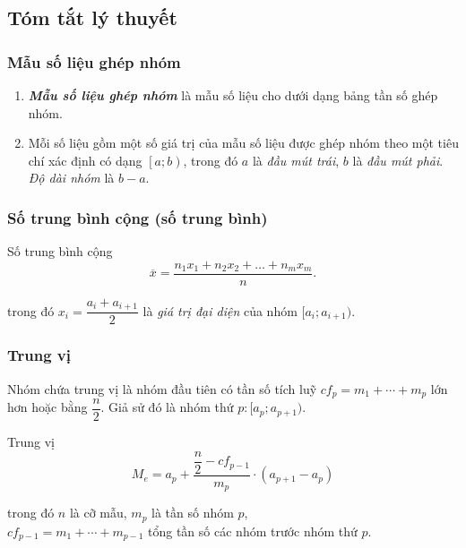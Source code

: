 \setcounter{chapter}{2}
\setcounter{subsubsection}{0}
\setcounter{ex}{0}
\setcounter{bt}{0}
\def\tenchude{Các số đặc trưng đo xu thế trung tâm cho mẫu số liệu ghép nhóm}

\subsection{Tóm tắt lý thuyết}
\subsubsection{Mẫu số liệu ghép nhóm}
\begin{enumerate}
	\item \textbf{\textit{Mẫu số liệu ghép nhóm}} là mẫu số liệu cho dưới dạng bảng tần số ghép nhóm.
	\item Mỗi số liệu gồm một số giá trị của mẫu số liệu được ghép nhóm theo một tiêu chí xác định có dạng $\left[a;b\right)$, trong đó $a$ là \textit{đầu mút trái}, $b$ là \textit{đầu mút phải}. \\
	\textit{Độ dài nhóm} là $b-a$.
\end{enumerate}
\subsubsection{Số trung bình cộng (số trung bình)}
\begin{khung4}{Số trung bình cộng}
	$$\overline{x} = \dfrac{n_1x_1 + n_2x_2 + \ldots + n_mx_m}{n}.$$
\end{khung4}
trong đó $x_i=\dfrac{a_i+a_{i+1}}{2}$ là \textit{giá trị đại diện} của nhóm $[a_i;a_{i+1})$.

\subsubsection{Trung vị}
Nhóm chứa trung vị là nhóm đầu tiên có tần số tích luỹ $cf_p=m_1 + \cdots + m_{p}$ lớn hơn hoặc bằng $\dfrac{n}{2}$. Giả sử đó là nhóm thứ $p : [a_p; a_{p + 1})$.
\begin{khung4}{Trung vị}
	$$M_e = a_p + \dfrac{\dfrac{n}{2} - cf_{p-1}}{m_p} \cdot ( a_{p + 1} - a_p)$$
\end{khung4}
trong đó $n$ là cỡ mẫu, $m_p$ là tần số nhóm $p$, \\$cf_{p-1}=m_1 + \cdots + m_{p-1}$ tổng tần số các nhóm trước nhóm thứ $p$.

